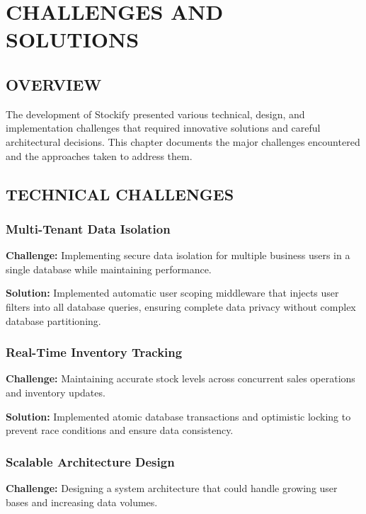 \chapter{CHALLENGES AND SOLUTIONS}

\section{OVERVIEW}

The development of Stockify presented various technical, design, and implementation challenges that required innovative solutions and careful architectural decisions. This chapter documents the major challenges encountered and the approaches taken to address them.

\section{TECHNICAL CHALLENGES}

\subsection{Multi-Tenant Data Isolation}

\textbf{Challenge:} Implementing secure data isolation for multiple business users in a single database while maintaining performance.

\textbf{Solution:} Implemented automatic user scoping middleware that injects user filters into all database queries, ensuring complete data privacy without complex database partitioning.

\subsection{Real-Time Inventory Tracking}

\textbf{Challenge:} Maintaining accurate stock levels across concurrent sales operations and inventory updates.

\textbf{Solution:} Implemented atomic database transactions and optimistic locking to prevent race conditions and ensure data consistency.

\subsection{Scalable Architecture Design}

\textbf{Challenge:} Designing a system architecture that could handle growing user bases and increasing data volumes.

